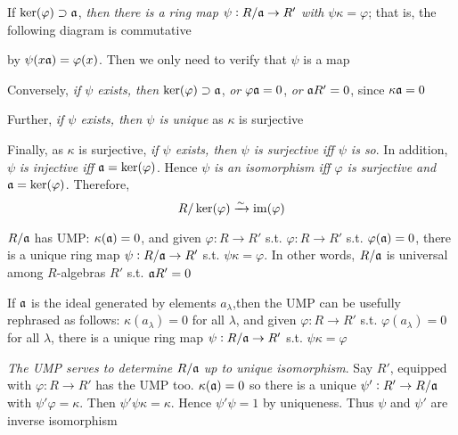 \documentclass[11pt]{article}
\begin{document}
If \(\ker(\varphi)\supset\mathfrak{a}\), \emph{then there is a ring map} \(\psi:R/\mathfrak{a}\to R'\)
\emph{with} \(\psi\kappa=\varphi\); that is, the following diagram is commutative

\begin{center}
\end{center}
by \(\psi(x\mathfrak{a})=\varphi(x)\). Then we only need to verify that \(\psi\) is a map

Conversely, \emph{if \(\psi\) exists, then} \(\ker(\varphi)\supset\mathfrak{a}\), \emph{or}
\(\varphi\mathfrak{a}=0\), \emph{or} \(\mathfrak{a} R'=0\), since \(\kappa\mathfrak{a}=0\)

Further, \emph{if \(\psi\) exists, then \(\psi\) is unique} as \(\kappa\) is surjective

Finally, as \(\kappa\) is surjective, \emph{if \(\psi\) exists, then \(\psi\) is surjective}
\emph{iff \(\psi\) is so}. In addition, \(\psi\) \emph{is injective iff \(\mathfrak{a}=\ker(\varphi)\)}.
Hence \(\psi\) \emph{is an isomorphism iff \(\varphi\) is surjective and}
\(\mathfrak{a}=\ker(\varphi)\). Therefore,
\begin{equation*}
R/\ker(\varphi)\xrightarrow{\sim}\operatorname{im}(\varphi)
\end{equation*}

\(R/\mathfrak{a}\) has UMP: \(\kappa(\mathfrak{a})=0\), and given \(\varphi:R\to R'\) s.t.
\(\varphi:R\to R'\) s.t. \(\varphi(\mathfrak{a})=0\), there is a unique ring map
\(\psi:R/\mathfrak{a}\to R'\) s.t. \(\psi\kappa=\varphi\). In other words, \(R/\mathfrak{a}\)
is universal among \(R\)-algebras \(R'\) s.t. \(\mathfrak{a} R'=0\)

If \(\mathfrak{a}\) is the ideal generated by elements \(a_\lambda\),then the UMP can
be usefully rephrased as follows: \(\kappa(a_\lambda)=0\) for all \(\lambda\),
and given \(\varphi:R\to R'\) s.t. \(\varphi(a_\lambda)=0\) for all \(\lambda\),
there is a unique ring map \(\psi:R/\mathfrak{a}\to R'\) s.t. \(\psi\kappa=\varphi\)

\emph{The UMP serves to determine} \(R/\mathfrak{a}\) \emph{up to unique isomorphism}.
Say \(R'\), equipped with \(\varphi:R\to R'\) has the UMP too.
\(\kappa(\mathfrak{a})=0\) so there is a unique \(\psi':R'\to R/\mathfrak{a}\) with
\(\psi'\varphi=\kappa\). Then \(\psi'\psi\kappa=\kappa\). Hence
\(\psi'\psi=1\) by uniqueness. Thus \(\psi\) and \(\psi'\) are inverse isomorphism
\begin{center}
\end{center}
\end{document}
